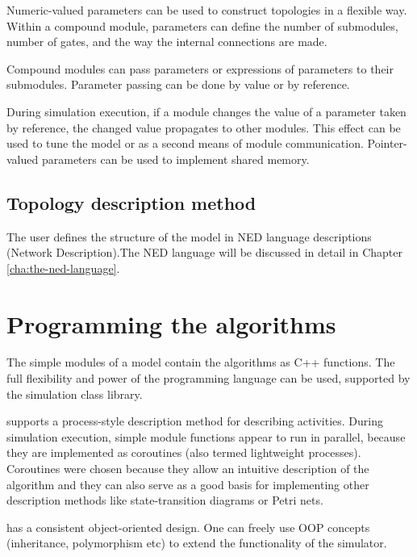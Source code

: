 Numeric-valued parameters can be used to construct topologies in a
flexible way. Within a compound module, parameters can define the
number of submodules, number of gates, and the way the internal
connections are made.


Compound modules can pass parameters or expressions of parameters
to their submodules. Parameter passing can be done by value or
by reference.

During simulation execution, if a module changes the value of
a parameter taken by reference, the changed value propagates
to other modules. This effect can be used to tune the model or
as a second means of module communication. Pointer-valued parameters
can be used to implement shared memory.


\subsection{Topology description method}
The user defines the structure of the model in NED language descriptions
(Network Description).The NED language will be discussed in detail
in Chapter \ref{cha:the-ned-language}.


\section{Programming the algorithms}

The simple modules of a model contain the algorithms as C++ functions.
The full flexibility and power of the programming language can
be used, supported by the {\opp} simulation class library.


{\opp} supports a process-style description method for describing
activities. During simulation execution, simple module functions
appear to run in parallel, because they are implemented as coroutines
(also termed lightweight processes). Coroutines were chosen because
they allow an intuitive description of the algorithm and they
can also serve as a good basis for implementing other description
methods like state-transition diagrams or Petri nets.

{\opp} has a consistent object-oriented design. One can freely
use OOP concepts (inheritance, polymorphism etc) to extend the
functionality of the simulator.

